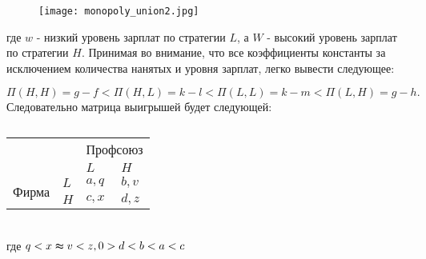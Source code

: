 \begin{figure}[h]
	\texttt{[image: monopoly\_union2.jpg]}
	\caption{}
	\label{fig:monopoly_union1}
\end{figure}

где $w$ - низкий уровень зарплат по стратегии $L$, а $W$ - высокий уровень зарплат по стратегии $H$. 
Принимая во внимание, что все коэффициенты константы за исключением количества нанятых и уровня зарплат, легко вывести следующее:

\begin{equation}
\Pi(H,H)=g-f < \Pi(H,L)=k-l < \Pi(L, L)=k-m < \Pi(L,H)=g-h.
\end{equation}
Следовательно матрица выигрышей будет следующей:
\begin{table}[h]
	
	\centering
	\begin{tabular}{|l|l|l|l|}
		\hline
		\multicolumn{2}{|l|}{\multirow{2}{*}{}} & \multicolumn{2}{l|}{Профсоюз} \\ \cline{3-4} 
		\multicolumn{2}{|l|}{}                  & $L$            & $H$            \\ \hline
		\multirow{2}{*}{Фирма}     & $L$     & $a,q$          & $b,v$          \\ \cline{2-4} 
		& $H$     & $c,x$          & $d,z$          \\ \hline
	\end{tabular}
	\caption{}
	\label{table:firm}
	
	
\end{table}\\
где $q < x \thickapprox v < z, 0 > d < b < a < c$
